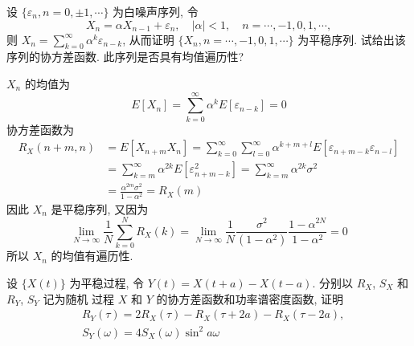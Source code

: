 \documentclass[boxes]{homework}
\begin{document}
\begin{problem}
设 $\{\varepsilon_n, n = 0, \pm 1, \cdots\}$ 为白噪声序列, 令
\begin{equation}
    X_n = \alpha X_{n - 1} + \varepsilon_n, \quad \left\lvert \alpha \right\rvert < 1, \quad
    n = \cdots, -1, 0, 1, \cdots,
\end{equation}
则 $\displaystyle X_n = \sum_{k = 0}^\infty \alpha^k\varepsilon_{n - k}$, 从而证明
$\{X_n, n = \cdots, -1, 0, 1, \cdots\}$ 为平稳序列. 试给出该序列的协方差函数. 此序列是否具有均值遍历性?
\end{problem}
\begin{solution}
    $X_n$ 的均值为
    \begin{equation}
        E[X_n] = \sum_{k = 0}^\infty \alpha^k E[\varepsilon_{n-k}] = 0
    \end{equation}
    协方差函数为
    \begin{equation}
        \begin{aligned}
            R_X(n+m, n) & = E[X_{n+m}X_n] = \sum_{k = 0}^\infty\sum_{l = 0}^\infty \alpha^{k + m + l} E[\varepsilon_{n+m-k}\varepsilon_{n-l}] \\
                        & = \sum_{k = m}^\infty \alpha^{2k}E[\varepsilon^2_{n+m-k}] = \sum_{k = m}^\infty \alpha^{2k}\sigma^2                 \\
                        & = \frac{\alpha^{2m}\sigma^2}{1-\alpha^2} = R_X(m)
        \end{aligned}
    \end{equation}
    因此 $X_n$ 是平稳序列, 又因为
    \begin{equation}
        \lim_{N \to \infty} \frac{1}{N}\sum_{k = 0}^NR_X(k) = \lim_{N\to\infty}\frac{1}{N}\frac{\sigma^2}{(1-\alpha^2)}\frac{1-\alpha^{2N}}{1-\alpha^2} = 0
    \end{equation}
    所以 $X_n$ 的均值有遍历性.
\end{solution}
\begin{problem}
设 $\{X(t)\}$ 为平稳过程, 令 $Y(t) = X(t + a) - X(t - a)$. 分别以 $R_X$, $S_X$ 和 $R_Y$, $S_Y$ 记为随机
过程 $X$ 和 $Y$ 的协方差函数和功率谱密度函数, 证明
\begin{align}
     & R_Y(\tau) = 2R_X(\tau) - R_X(\tau + 2a) - R_X(\tau - 2a), \\
     & S_Y(\omega) = 4 S_X(\omega)\sin^2 a\omega
\end{align}
\end{problem}
\end{document}
